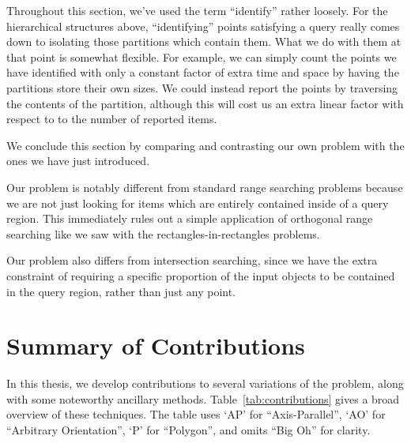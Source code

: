 Throughout this section, we've used the term ``identify'' rather loosely.
For the hierarchical structures above, ``identifying'' points satisfying a query really comes down to isolating those partitions which contain them.
What we do with them at that point is somewhat flexible.
For example, we can simply count the points we have identified with only a constant factor of extra time and space by having the partitions store their own sizes.
We could instead report the points by traversing the contents of the partition, although this will cost us an extra linear factor with respect to to the number of reported items.

We conclude this section by comparing and contrasting our own problem with the ones we have just introduced.

Our problem is notably different from standard range searching problems because we are not just looking for items which are entirely contained inside of a query region.
This immediately rules out a simple application of orthogonal range searching like we saw with the rectangles-in-rectangles problems.

Our problem also differs from intersection searching, since we have the extra constraint of requiring a specific proportion of the input objects to be contained in the query region, rather than just any point.


\section{Summary of Contributions}
\label{:intro:contributions}

In this thesis, we develop contributions to several variations of the \PERS{} problem, along with some noteworthy ancillary methods. 
Table~\ref{tab:contributions} gives a broad overview of these techniques. 
The table uses `AP' for ``Axis-Parallel'', `AO' for ``Arbitrary Orientation'', `P' for ``Polygon'', and omits ``Big Oh'' for clarity.

